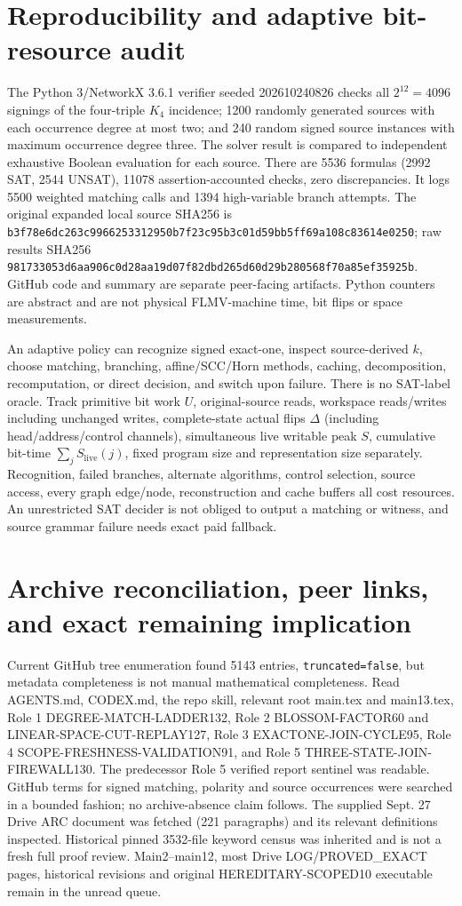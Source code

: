 \documentclass[11pt]{article}
\begin{document}
\section{Reproducibility and adaptive bit-resource audit}
The Python 3/NetworkX 3.6.1 verifier seeded 202610240826 checks all $2^{12}=4096$ signings of the four-triple $K_4$ incidence; 1200 randomly generated sources with each occurrence degree at most two; and 240 random signed source instances with maximum occurrence degree three. The solver result is compared to independent exhaustive Boolean evaluation for each source. There are 5536 formulas (2992 SAT, 2544 UNSAT), 11078 assertion-accounted checks, zero discrepancies. It logs 5500 weighted matching calls and 1394 high-variable branch attempts. The original expanded local source SHA256 is \texttt{b3f78e6dc263c9966253312950b7f23c95b3c01d59bb5ff69a108c83614e0250}; raw results SHA256 \texttt{981733053d6aa906c0d28aa19d07f82dbd265d60d29b280568f70a85ef35925b}. GitHub code and summary are separate peer-facing artifacts. Python counters are abstract and are not physical FLMV-machine time, bit flips or space measurements.

An adaptive policy can recognize signed exact-one, inspect source-derived $k$, choose matching, branching, affine/SCC/Horn methods, caching, decomposition, recomputation, or direct decision, and switch upon failure. There is no SAT-label oracle. Track primitive bit work $U$, original-source reads, workspace reads/writes including unchanged writes, complete-state actual flips $\Delta$ (including head/address/control channels), simultaneous live writable peak $S$, cumulative bit-time $\sum_j S_{\mathrm{live}}(j)$, fixed program size and representation size separately. Recognition, failed branches, alternate algorithms, control selection, source access, every graph edge/node, reconstruction and cache buffers all cost resources. An unrestricted SAT decider is not obliged to output a matching or witness, and source grammar failure needs exact paid fallback.

\section{Archive reconciliation, peer links, and exact remaining implication}
Current GitHub tree enumeration found 5143 entries, \texttt{truncated=false}, but metadata completeness is not manual mathematical completeness. Read AGENTS.md, CODEX.md, the repo skill, relevant root main.tex and main13.tex, Role 1 DEGREE-MATCH-LADDER132, Role 2 BLOSSOM-FACTOR60 and LINEAR-SPACE-CUT-REPLAY127, Role 3 EXACTONE-JOIN-CYCLE95, Role 4 SCOPE-FRESHNESS-VALIDATION91, and Role 5 THREE-STATE-JOIN-FIREWALL130. The predecessor Role 5 verified report sentinel was readable. GitHub terms for signed matching, polarity and source occurrences were searched in a bounded fashion; no archive-absence claim follows. The supplied Sept. 27 Drive ARC document was fetched (221 paragraphs) and its relevant definitions inspected. Historical pinned 3532-file keyword census was inherited and is not a fresh full proof review. Main2--main12, most Drive LOG/PROVED_EXACT pages, historical revisions and original HEREDITARY-SCOPED10 executable remain in the unread queue.
\end{document}

